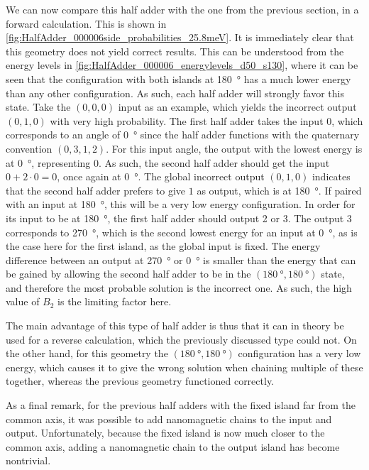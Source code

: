 \documentclass[11pt,a4paper,english,twoside]{article}
\begin{document}
We can now compare this half adder with the one from the previous section, in a forward calculation. This is shown in \cref{fig:HalfAdder_000006side_probabilities_25.8meV}. It is immediately clear that this geometry does not yield correct results. This can be understood from the energy levels in \cref{fig:HalfAdder_000006_energylevels_d50_s130}, where it can be seen that the configuration with both islands at \SI{180}{\degree} has a much lower energy than any other configuration. As such, each half adder will strongly favor this state. Take the $(0,0,0)$ input as an example, which yields the incorrect output $(0,1,0)$ with very high probability. The first half adder takes the input 0, which corresponds to an angle of \SI{0}{\degree} since the half adder functions with the quaternary convention $(0,3,1,2)$. For this input angle, the output with the lowest energy is at \SI{0}{\degree}, representing 0. As such, the second half adder should get the input $0+2\cdot0=0$, once again at \SI{0}{\degree}. The global incorrect output $(0,1,0)$ indicates that the second half adder prefers to give $1$ as output, which is at \SI{180}{\degree}. If paired with an input at \SI{180}{\degree}, this will be a very low energy configuration. In order for its input to be at \SI{180}{\degree}, the first half adder should output 2 or 3. The output 3 corresponds to \SI{270}{\degree}, which is the second lowest energy for an input at \SI{0}{\degree}, as is the case here for the first island, as the global input is fixed. The energy difference between an output at \SI{270}{\degree} or \SI{0}{\degree} is smaller than the energy that can be gained by allowing the second half adder to be in the $(\SI{180}{\degree}, \SI{180}{\degree})$ state, and therefore the most probable solution is the incorrect one. As such, the high value of $B_2$ is the limiting factor here. \par
The main advantage of this type of half adder is thus that it can in theory be used for a reverse calculation, which the previously discussed type could not. On the other hand, for this geometry the $(\SI{180}{\degree}, \SI{180}{\degree})$ configuration has a very low energy, which causes it to give the wrong solution when chaining multiple of these together, whereas the previous geometry functioned correctly.

As a final remark, for the previous half adders with the fixed island far from the common axis, it was possible to add nanomagnetic chains to the input and output. Unfortunately, because the fixed island is now much closer to the common axis, adding a nanomagnetic chain to the output island has become nontrivial.
\end{document}

